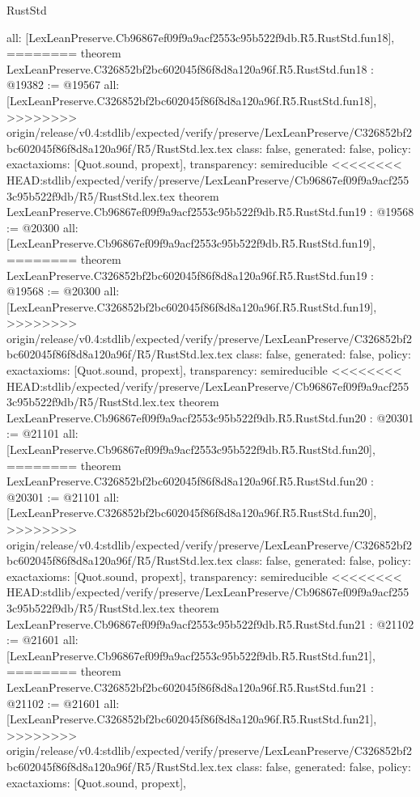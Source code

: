 \begin{lexlean}{RustStd}
\begin{coremodule}
{\begin{coremodule}
{{{{{{{{{{{{{{{{{{{{{  all: [LexLeanPreserve.Cb96867ef09f9a9acf2553c95b522f9db.R5.RustStd.fun18],
========
theorem LexLeanPreserve.C326852bf2bc602045f86f8d8a120a96f.R5.RustStd.fun18 : @19382 := @19567 {
  all: [LexLeanPreserve.C326852bf2bc602045f86f8d8a120a96f.R5.RustStd.fun18],
>>>>>>>> origin/release/v0.4:stdlib/expected/verify/preserve/LexLeanPreserve/C326852bf2bc602045f86f8d8a120a96f/R5/RustStd.lex.tex
  class: false,
  generated: false,
  policy: exact{axioms: [Quot.sound, propext]},
  transparency: semireducible
}
<<<<<<<< HEAD:stdlib/expected/verify/preserve/LexLeanPreserve/Cb96867ef09f9a9acf2553c95b522f9db/R5/RustStd.lex.tex
theorem LexLeanPreserve.Cb96867ef09f9a9acf2553c95b522f9db.R5.RustStd.fun19 : @19568 := @20300 {
  all: [LexLeanPreserve.Cb96867ef09f9a9acf2553c95b522f9db.R5.RustStd.fun19],
========
theorem LexLeanPreserve.C326852bf2bc602045f86f8d8a120a96f.R5.RustStd.fun19 : @19568 := @20300 {
  all: [LexLeanPreserve.C326852bf2bc602045f86f8d8a120a96f.R5.RustStd.fun19],
>>>>>>>> origin/release/v0.4:stdlib/expected/verify/preserve/LexLeanPreserve/C326852bf2bc602045f86f8d8a120a96f/R5/RustStd.lex.tex
  class: false,
  generated: false,
  policy: exact{axioms: [Quot.sound, propext]},
  transparency: semireducible
}
<<<<<<<< HEAD:stdlib/expected/verify/preserve/LexLeanPreserve/Cb96867ef09f9a9acf2553c95b522f9db/R5/RustStd.lex.tex
theorem LexLeanPreserve.Cb96867ef09f9a9acf2553c95b522f9db.R5.RustStd.fun20 : @20301 := @21101 {
  all: [LexLeanPreserve.Cb96867ef09f9a9acf2553c95b522f9db.R5.RustStd.fun20],
========
theorem LexLeanPreserve.C326852bf2bc602045f86f8d8a120a96f.R5.RustStd.fun20 : @20301 := @21101 {
  all: [LexLeanPreserve.C326852bf2bc602045f86f8d8a120a96f.R5.RustStd.fun20],
>>>>>>>> origin/release/v0.4:stdlib/expected/verify/preserve/LexLeanPreserve/C326852bf2bc602045f86f8d8a120a96f/R5/RustStd.lex.tex
  class: false,
  generated: false,
  policy: exact{axioms: [Quot.sound, propext]},
  transparency: semireducible
}
<<<<<<<< HEAD:stdlib/expected/verify/preserve/LexLeanPreserve/Cb96867ef09f9a9acf2553c95b522f9db/R5/RustStd.lex.tex
theorem LexLeanPreserve.Cb96867ef09f9a9acf2553c95b522f9db.R5.RustStd.fun21 : @21102 := @21601 {
  all: [LexLeanPreserve.Cb96867ef09f9a9acf2553c95b522f9db.R5.RustStd.fun21],
========
theorem LexLeanPreserve.C326852bf2bc602045f86f8d8a120a96f.R5.RustStd.fun21 : @21102 := @21601 {
  all: [LexLeanPreserve.C326852bf2bc602045f86f8d8a120a96f.R5.RustStd.fun21],
>>>>>>>> origin/release/v0.4:stdlib/expected/verify/preserve/LexLeanPreserve/C326852bf2bc602045f86f8d8a120a96f/R5/RustStd.lex.tex
  class: false,
  generated: false,
  policy: exact{axioms: [Quot.sound, propext]},
}}}}}}}}}}}}}}}}}}}}}}}}}
\end{coremodule}}
\end{coremodule}
\end{lexlean}
